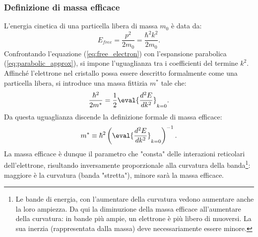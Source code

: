 \documentclass[a4paper,11pt]{report}
\begin{document}
\subsubsection{Definizione di massa efficace}
L'energia cinetica di una particella libera di massa $m_0$ è data da:
\begin{equation}
    E_{free} = \frac{p^2}{2m_0} = \frac{\hbar^2 k^2}{2m_0}.
    \label{eq:free_electron}
\end{equation}
Confrontando l'equazione (\ref{eq:free_electron}) con l'espansione parabolica (\ref{eq:parabolic_approx}), si impone l'uguaglianza tra i coefficienti del termine $k^2$. Affinché l'elettrone nel cristallo possa essere descritto formalmente come una particella libera, si introduce una massa fittizia $m^*$ tale che:
\begin{equation}
    \frac{\hbar^2}{2m^*} = \frac{1}{2} \eval{\frac{d^2 E}{d k^2}}_{k=0}.
\end{equation}
Da questa uguaglianza discende la definizione formale di massa efficace:
\begin{equation}
    m^* \equiv \hbar^2 \left( \eval{\frac{d^2 E}{d k^2}}_{k=0} \right)^{-1}.
    \label{eq:effective_mass_def}
\end{equation}
La massa efficace è dunque il parametro che "consta" delle interazioni reticolari dell'elettrone, risultando inversamente proporzionale alla curvatura della banda\footnote{Le bande di energia, con l'aumentare della curvatura vedono aumentare anche la loro ampiezza. Da qui la diminuzione della massa efficace all'aumentare della curvatura: in bande più ampie, un elettrone è più libero di muoversi. La sua inerzia (rappresentata dalla massa) deve necessariamente essere minore.}: maggiore è la curvatura (banda "stretta"), minore sarà la massa efficace.  
\end{document}
